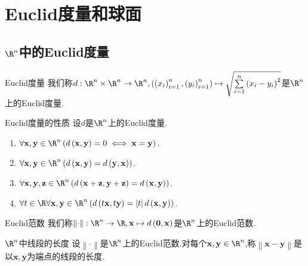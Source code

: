 \chapter{Euclid度量和球面}

\section{\texorpdfstring{$\R^{n}$}{Rn}中的Euclid度量}

\begin{definition}{Euclid度量}{}
	我们称$d:\R^{n}\times\R^{n}\to\R^{n},\left(\left(x_{i}\right)_{i=1}^{n},\left(y_{i}\right)_{i=1}^{n}\right)\mapsto\sqrt{\sum\limits_{i=1}^{n}\left(x_{i}-y_{i}\right)^{2}}$是$\R^{n}$上的Euclid度量.
\end{definition}

\begin{proposition}{Euclid度量的性质}{}
	设$d$是$\R^{n}$上的Euclid度量.
	\begin{enumerate}
		\item $\forall \mathbf{x},\mathbf{y}\in\R^{n}\left(d\left(\mathbf{x},\mathbf{y}\right)=0\iff \mathbf{x}=\mathbf{y}\right)$.
		\item $\forall \mathbf{x},\mathbf{y}\in\R^{n}\left(d\left(\mathbf{x},\mathbf{y}\right)=d\left(\mathbf{y},\mathbf{x}\right)\right)$.
		\item $\forall \mathbf{x},\mathbf{y},\mathbf{z}\in\R^{n}\left(d\left(\mathbf{x}+\mathbf{z},\mathbf{y}+\mathbf{z}\right)=d\left(\mathbf{x},\mathbf{y}\right)\right)$.
		\item $\forall t\in\R\forall \mathbf{x},\mathbf{y}\in\R^{n}\left(d\left(t\mathbf{x},t\mathbf{y}\right)=\left|t\right|d\left(\mathbf{x},\mathbf{y}\right)\right)$.
	\end{enumerate}
\end{proposition}

\begin{definition}{Euclid范数}{}
	我们称$\left\|\cdot\right\|:\R^{n}\to\R,\mathbf{x}\mapsto d\left(\mathbf{0},\mathbf{x}\right)$是$\R^{n}$上的Euclid范数.
\end{definition}

\begin{definition}{$\R^{n}$中线段的长度}{}
	设$\left\|\cdot\right\|$是$\R^{n}$上的Euclid范数.对每个$\mathbf{x},\mathbf{y}\in\R^{n}$,称$\left\|\mathbf{x}-\mathbf{y}\right\|$是以$\mathbf{x},\mathbf{y}$为端点的线段的长度.
\end{definition}

